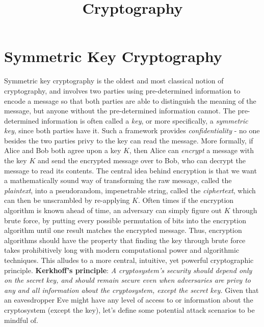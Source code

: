 \documentclass{article}
\begin{document}
\title{Cryptography}
\maketitle

\section{Symmetric Key Cryptography}
Symmetric key cryptography is the oldest and most classical notion of cryptography, and involves two parties using pre-determined information to encode a message so that both parties are able to distinguish the meaning of the message, but anyone without the pre-determined information cannot. The pre-determined information is often called a \textit{key}, or more specifically, a \textit{symmetric key}, since both parties have it. Such a framework provides \textit{confidentiality} - no one besides the two parties privy to the key can read the message.
\newline \newline
More formally, if Alice and Bob both agree upon a key $ K $, then Alice can \textit{encrypt} a message with the key $ K $ and send the encrypted message over to Bob, who can decrypt the message to read its contents. The central idea behind encryption is that we want a mathematically sound way of transforming the raw message, called the \textit{plaintext}, into a pseudorandom, impenetrable string, called the \textit{ciphertext}, which can then be unscrambled by re-applying $ K $. Often times if the encryption algorithm is known ahead of time, an adversary can simply figure out $ K $ through brute force, by putting every possible permutation of bits into the encryption algorithm until one result matches the encrypted message. Thus, encryption algorithms should have the property that finding the key through brute force takes prohibitively long with modern computational power and algorithmic techniques. This alludes to a more central, intuitive, yet powerful cryptographic principle.
\newline \newline
\textbf{Kerkhoff's principle}: \textit{A cryptosystem's security should depend only on the secret key, and should remain secure even when adversaries are privy to any and all information about the cryptosystem, except the secret key.}
\newline \newline
Given that an eavesdropper Eve might have any level of access to or information about the cryptosystem (except the key), let's define some potential attack scenarios to be mindful of.
\end{document}
